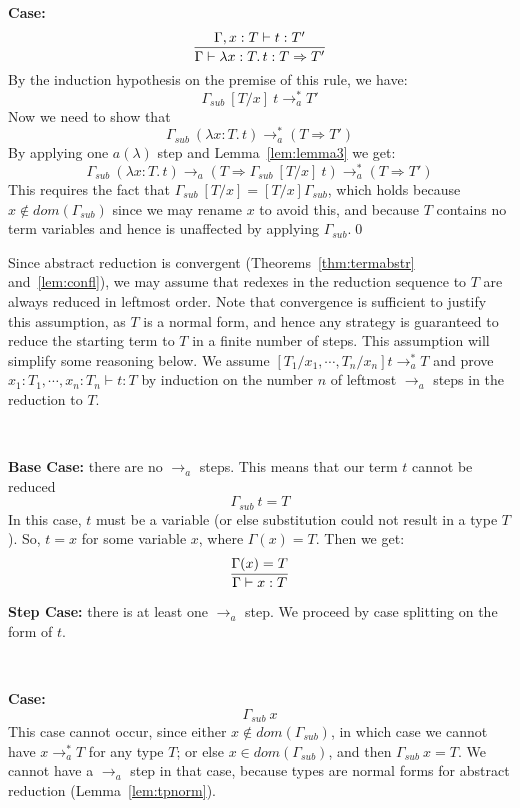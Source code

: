 \documentclass{LMCS}
\newcommand{\To}[0]{\Rightarrow}
\begin{document}
\noindent \textbf{Case:}
\[
\infer{\Gamma\vdash \lambda x : T.\,t : T \To T'}
      {\Gamma,x:T\vdash t:T'}
\]
\noindent By the induction hypothesis on the premise of this rule,
we have:
\[
\Gamma_{sub}\ [T/x]\ t \to_a^* T'
\]
\noindent Now we need to show that
\[
\Gamma_{sub}\ (\lambda x : T.\,t) \to_a^* (T \To T')
\]
\noindent By applying one $a(\lambda)$ step and Lemma~\ref{lem:lemma3}
we get:
\[
\Gamma_{sub}\ (\lambda x : T.\,t) \to_a
(T \To \Gamma_{sub}\ [T/x]\ t) \to_a^* (T \To T')
\]
\noindent This requires the fact that $\Gamma_{sub}\ [T/x] =
          [T/x]\Gamma_{sub}$, which holds because
          $x\not\in\textit{dom}(\Gamma_{sub})$ since we may rename $x$
          to avoid this, and because $T$ contains no term variables
          and hence is unaffected by applying $\Gamma_{sub}$.\qed


Since abstract reduction is convergent (Theorems~\ref{thm:termabstr}
and~\ref{lem:confl}), we may assume that redexes in the reduction
sequence to $T$ are always reduced in leftmost order.  Note that
convergence is sufficient to justify this assumption, as $T$ is a
normal form, and hence any strategy is guaranteed to reduce the
starting term to $T$ in a finite number of steps.  This assumption
will simplify some reasoning below.  We assume
$[T_1/x_1,\cdots,T_n/x_n]t \to_a^* T$ and prove
$x_1:T_1,\cdots,x_n:T_n \vdash t:T$ by induction on the number $n$ of
leftmost $\to_a$ steps in the reduction to $T$.

\

\noindent \textbf{Base Case:} there are no $\to_a$ steps.
This means that our term $t$ cannot be reduced
\[
\Gamma_{sub}\ t = T
\]
\noindent In this case, $t$ must be a variable (or else substitution could not
result in a type $T$). So, $t=x$ for some variable $x$, where
$\Gamma(x)=T$. Then we get:
\[
\infer{\Gamma\vdash x : T}{\Gamma(x) = T}
\]

\noindent \textbf{Step Case:}
there is at least one $\to_a$ step.  We proceed by case splitting on the form of $t$.

\

\noindent\textbf{Case:}
\[
\Gamma_{sub}\ x
\]
\noindent This case cannot occur, since either
$x\not\in\textit{dom}(\Gamma_{sub})$, in which case we cannot have
$x\to_a^* T$ for any type $T$; or else
$x\in\textit{dom}(\Gamma_{sub})$, and then $\Gamma_{sub}\ x = T$.  We
cannot have a $\to_a$ step in that case, because types are normal
forms for abstract reduction (Lemma~\ref{lem:tpnorm}).
\end{document}
